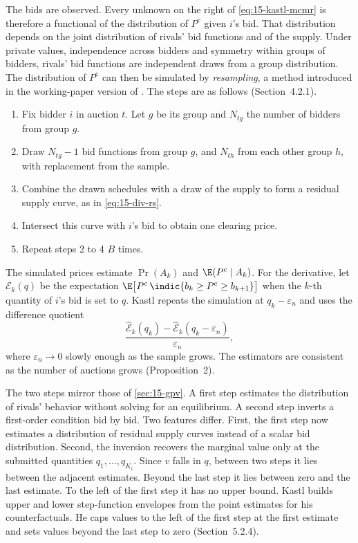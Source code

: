  The bids are observed. Every unknown on the right of
\eqref{eq:15-kastl-mcmr} is therefore a functional of the distribution of $P^{\mathrm c}$ given $i$'s bid.
That distribution depends on the joint distribution of rivals' bid functions and of the supply. Under private
values, independence across bidders and symmetry within groups of bidders, rivals' bid functions are
independent draws from a group distribution. The distribution of $P^{\mathrm c}$ can then be simulated by
\emph{resampling}, a method introduced in the working-paper version of \citet{HortacsuMcAdams2010}. The steps
are as follows (Section~4.2.1).
\begin{enumerate}[label=\arabic*.]
\item Fix bidder $i$ in auction $t$. Let $g$ be its group and $N_{tg}$ the number of bidders from group $g$.
\item Draw $N_{tg}-1$ bid functions from group $g$, and $N_{th}$ from each other group $h$, with replacement
from the sample.
\item Combine the drawn schedules with a draw of the supply to form a residual supply curve, as in
\eqref{eq:15-div-rs}.
\item Intersect this curve with $i$'s bid to obtain one clearing price.
\item Repeat steps 2 to 4 $B$ times.
\end{enumerate}
The simulated prices estimate $\Pr(A_k)$ and $\E(P^{\mathrm c}\mid A_k)$. For the derivative, let
$\mathcal E_k(q)$ be the expectation $\E\bigl[P^{\mathrm c}\,\indic\{b_k\ge P^{\mathrm c}\ge b_{k+1}\}\bigr]$
when the $k$-th quantity of $i$'s bid is set to $q$. Kastl repeats the simulation at $q_k-\varepsilon_n$ and
uses the difference quotient
\[
\frac{\hat{\mathcal E}_k(q_k)-\hat{\mathcal E}_k(q_k-\varepsilon_n)}{\varepsilon_n},
\]
where $\varepsilon_n\to0$ slowly enough as the sample grows. The estimators are consistent as the number of
auctions grows (Proposition~2).

The two steps mirror those of \cref{sec:15-gpv}. A first step estimates the distribution of rivals' behavior
without solving for an equilibrium. A second step inverts a first-order condition bid by bid. Two features
differ. First, the first step now estimates a distribution of residual supply curves instead of a scalar bid
distribution. Second, the inversion recovers the marginal value only at the submitted quantities
$q_1,\dots,q_{K_i}$. Since $v$ falls in $q$, between two steps it lies between the adjacent estimates. Beyond
the last step it lies between zero and the last estimate. To the left of the first step it has no upper
bound. Kastl builds upper and lower step-function envelopes from the point estimates for his
counterfactuals. He caps values to the left of the first step at the first estimate and sets values beyond
the last step to zero (Section~5.2.4).

